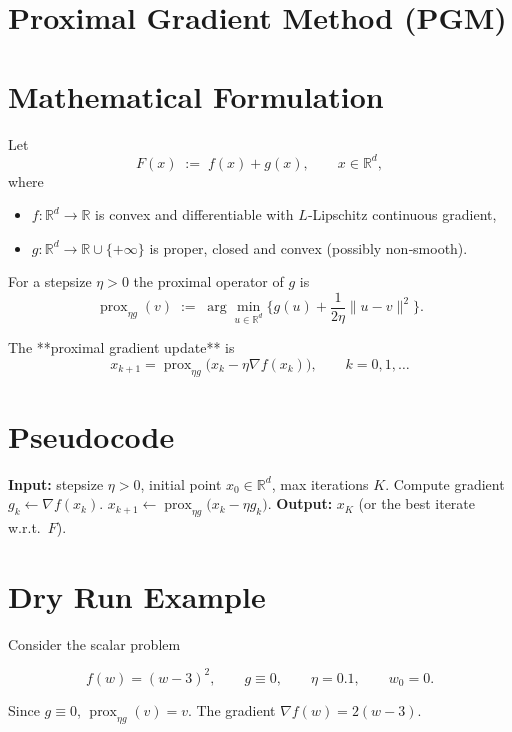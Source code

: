 \documentclass{article}
\begin{document}
\section*{Proximal Gradient Method (PGM)}

\section*{Mathematical Formulation}
Let  
\[
F(x)\;:=\;f(x)+g(x),\qquad x\in\mathbb R^{d},
\]
where  

\begin{itemize}
\item $f:\mathbb R^{d}\to\mathbb R$ is convex and differentiable with $L$‑Lipschitz continuous gradient,
\item $g:\mathbb R^{d}\to\mathbb R\cup\{+\infty\}$ is proper, closed and convex (possibly non‑smooth).
\end{itemize}
For a stepsize $\eta>0$ the proximal operator of $g$ is  
\[
\operatorname{prox}_{\eta g}(v)\;:=\;\arg\min_{u\in\mathbb R^{d}}\Big\{ g(u)+\frac{1}{2\eta}\|u-v\|^{2}\Big\}.
\]

The **proximal gradient update** is  
\[
\boxed{\,x_{k+1}= \operatorname{prox}_{\eta g}\bigl(x_{k}-\eta\nabla f(x_{k})\bigr),\qquad k=0,1,\dots\, } \tag{1}
\]

\section*{Pseudocode}
\begin{algorithm}[H]
\caption{Proximal Gradient Method}
\begin{algorithmic}[1]
\STATE \textbf{Input:} stepsize $\eta>0$, initial point $x_{0}\in\mathbb R^{d}$, max iterations $K$.
    \STATE Compute gradient $g_{k}\gets \nabla f(x_{k})$.
    \STATE $x_{k+1}\gets \operatorname{prox}_{\eta g}\bigl(x_{k}-\eta g_{k}\bigr)$.
\ENDFOR
\STATE \textbf{Output:} $x_{K}$ (or the best iterate w.r.t.\ $F$).
\end{algorithmic}
\end{algorithm}

\section*{Dry Run Example}
Consider the scalar problem  

\[
f(w)=(w-3)^{2},\qquad g\equiv 0,\qquad \eta=0.1,\qquad w_{0}=0 .
\]

Since $g\equiv0$, $\operatorname{prox}_{\eta g}(v)=v$.  
The gradient $\nabla f(w)=2(w-3)$.
\end{document}
